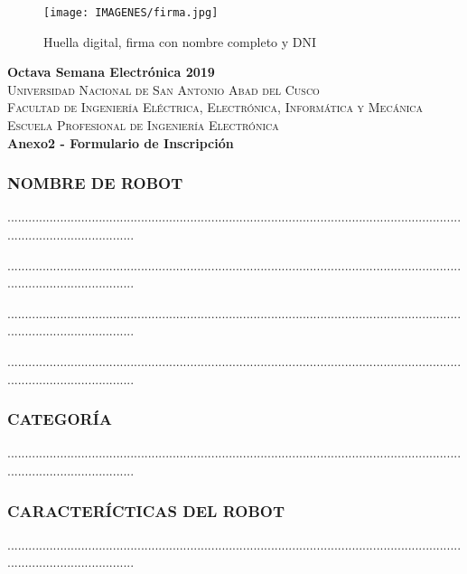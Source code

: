 \documentclass{article}
\begin{document}
\begin{figure}[hbtp]
\centering
\texttt{[image: IMAGENES/firma.jpg]}
\caption{Huella digital, firma con nombre completo y DNI}
\end{figure}

\newpage
{\center
{\Huge \bfseries Octava Semana Electrónica 2019} \\ [0.4cm]
\textsc{\LARGE  Universidad Nacional de San Antonio Abad del Cusco}\\[0.4cm] 
\textsc{\Large Facultad de Ingeniería Eléctrica, Electrónica, Informática y Mecánica}\\[0.4cm] 
\textsc{\large Escuela Profesional de Ingeniería Electrónica}\\[0.4cm]
{ \bfseries Anexo2 - Formulario de Inscripción}}

\subsubsection{NOMBRE DE ROBOT}

.....................................................................................................................................................................

.....................................................................................................................................................................

.....................................................................................................................................................................

.....................................................................................................................................................................


\subsubsection{CATEGORÍA}

.....................................................................................................................................................................

\subsubsection{CARACTERÍCTICAS DEL ROBOT}

.....................................................................................................................................................................
\end{document}
